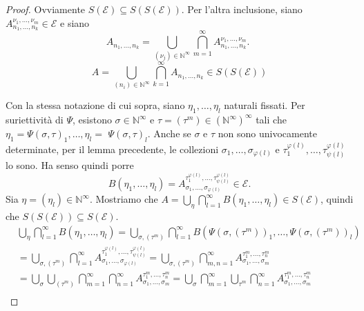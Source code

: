 \documentclass[a4paper, twoside,openright]{article}
\newcommand{\N}{\mathbb{N}}
\newcommand{\<}{\langle}
\renewcommand{\>}{\rangle}
\begin{document}
\begin{proof}
	Ovviamente $S(\mathcal{E}) \subseteq S(S(\mathcal{E}))$. Per l'altra inclusione, siano $A_{n_{1}, \ldots, n_{k}}^{\nu_{1}, \ldots, \nu_{m}} \in \mathcal{E}$ e siano
	$$ A_{n_{1}, \ldots, n_{k}}=\bigcup_{(\nu_j) \in \mathbb{N}^{\infty}} \bigcap_{m=1}^{\infty} A_{n_{1}, \ldots, n_{k}}^{\nu_{1}, \ldots, \nu_{m}} \text {. }	$$
	$$	A=\bigcup_{\left(n_{i}\right) \in \mathbb{N}^{\infty}} \bigcap_{k=1}^{\infty} A_{n_{1}, \ldots, n_{k}} \in S(S(\mathcal{E}))$$
	
	Con la stessa notazione di cui sopra, siano $\eta_{1}, \ldots, \eta_{l}$ naturali fissati. Per suriettività di $\Psi$, esistono $\sigma \in \mathbb{N}^{\infty}$ e $\tau=\left(\tau^{m}\right) \in\left(\mathbb{N}^{\infty}\right)^{\infty}$ tali che $\eta_{1}=\Psi(\sigma, \tau)_{1}, \ldots, \eta_{l}=$ $\Psi(\sigma, \tau)_{l}$. Anche se $\sigma$ e $\tau$ non sono univocamente determinate, per il lemma precedente, le collezioni $\sigma_{1}, \ldots, \sigma_{\varphi(l)}$ e $\tau_{1}^{\varphi(l)}, \ldots, \tau_{\psi(l)}^{\varphi(l)}$ lo sono. Ha senso quindi porre
	$$
	B\left(\eta_{1}, \ldots, \eta_{l}\right)=A_{\sigma_{1}, \ldots, \sigma_{\varphi(l)}}^{\tau_{1}^{\varphi(l)}, \ldots, \tau_{\psi(l)}^{\varphi(l)}} \in \mathcal{E} .
	$$
	Sia $\eta=\left(\eta_{l}\right)\in \N^{\infty}$. Mostriamo che $A=\bigcup_{\eta} \bigcap_{l=1}^{\infty} B\left(\eta_{1}, \ldots, \eta_{l}\right) \in S(\mathcal{E})$, quindi che $S(S(\mathcal{E})) \subseteq S(\mathcal{E})$.
	$$
	\begin{aligned}
		&\bigcup_{\eta} \bigcap_{l=1}^{\infty} B\left(\eta_{1}, \ldots, \eta_{l}\right)=\bigcup_{\sigma,\left(\tau^{m}\right)} \bigcap_{l=1}^{\infty} B\left(\Psi\left(\sigma,\left(\tau^{m}\right)\right)_{1}, \ldots, \Psi\left(\sigma,\left(\tau^{m}\right)\right)_{l}\right) \\
		&=\bigcup_{\sigma,\left(\tau^{m}\right)} \bigcap_{l=1}^{\infty} A_{\sigma_{1}, \ldots, \sigma_{\varphi(l)}}^{\tau_{1}^{\varphi(l)}, \ldots, \tau_{\psi(l)}^{\varphi(l)}}=\bigcup_{\sigma,\left(\tau^{m}\right)} \bigcap_{m, n=1}^{\infty} A_{\sigma_{1}, \ldots, \sigma_{m}}^{\tau_{1}^{m}, \ldots, \tau_{n}^{m}} \\
		&=\bigcup_{\sigma} \bigcup_{\left(\tau^{m}\right)} \bigcap_{m=1}^{\infty} \bigcap_{n=1}^{\infty} A_{\sigma_{1}, \ldots, \sigma_{m}}^{\tau_{1}^{m}, \ldots, \tau_{n}^{m}}=\bigcup_{\sigma} \bigcap_{m=1}^{\infty} \bigcup_{\tau^{m}} \bigcap_{n=1}^{\infty} A_{\sigma_{1}, \ldots, \sigma_{m}}^{\tau_{1}^{m}, \ldots, \tau_{n}^{m}} \\

\end{aligned}$$
\end{proof}
\end{document}

